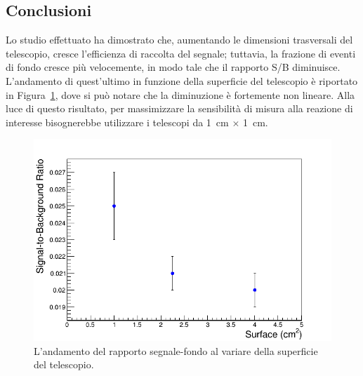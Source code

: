 \subsection*{Conclusioni}


Lo studio effettuato ha dimostrato che, aumentando le dimensioni trasversali del telescopio, cresce l'efficienza di raccolta del segnale; tuttavia, la frazione di eventi di fondo cresce più velocemente, in modo tale che il rapporto S/B diminuisce.
L'andamento di quest'ultimo in funzione della superficie del telescopio è riportato in Figura~\ref{fig:rapporto_segnale_fondo}, dove si può notare che la diminuzione è fortemente non lineare.
Alla luce di questo risultato, per massimizzare la sensibilità di misura alla reazione di interesse bisognerebbe utilizzare i telescopi da 1~cm $\times$ 1~cm.

\begin{figure} [!t]
	\centering
	\includegraphics[scale=0.5]{Grafici_Tesi2/Granularita/sig_back_ratio.png}
	\caption{L'andamento del rapporto segnale-fondo al variare della superficie del telescopio.} \label{fig:rapporto_segnale_fondo}
\end{figure}

